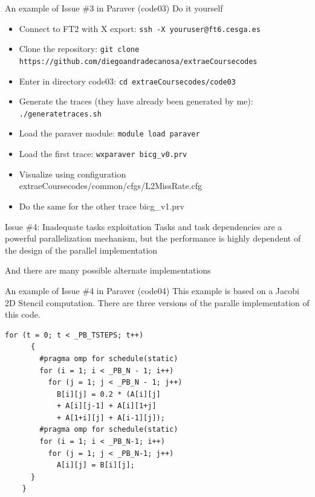 \documentclass[10pt,xcolor=table]{beamer}
\begin{document}
\begin{frame}{An example of Issue \#3 in Paraver (code03)}
Do it yourself
\begin{itemize}
    \item Connect to FT2 with X export: {\tt ssh -X youruser@ft6.cesga.es}
    \item Clone the repository: {\tt git clone https://github.com/diegoandradecanosa/extraeCoursecodes}
    \item Enter in directory code03: {\tt cd extraeCoursecodes/code03}
    \item Generate the traces (they have already been generated by me): {\tt ./generatetraces.sh}
    \item Load the paraver module:  {\tt module load paraver}
    \item Load the first trace: {\tt wxparaver bicg\_v0.prv}
    \item Visualize using configuration extraeCoursecodes/common/cfgs/L2MissRate.cfg 
    \item Do the same for the other trace bicg\_v1.prv
\end{itemize}
\end{frame}

\begin{frame}{Issue \#4: Inadequate tasks exploitation}
Tasks and task dependencies are a powerful parallelization mechanism, but the performance is highly dependent of the design of the parallel implementation

And there are many possible alternate implementations
\end{frame}

\begin{frame}[fragile]{An example of Issue \#4 in Paraver (code04)}
This example is based on a Jacobi 2D Stencil computation. There are three versions of the paralle implementation of this code. 
\begin{lstlisting}[style=shell,basicstyle=\scriptsize\ttfamily,gobble=3,caption={Parallelized with for pragmas (v0)}]
     for (t = 0; t < _PB_TSTEPS; t++)
      {
        #pragma omp for schedule(static) 
        for (i = 1; i < _PB_N - 1; i++)
          for (j = 1; j < _PB_N - 1; j++)
            B[i][j] = 0.2 * (A[i][j] 
            + A[i][j-1] + A[i][1+j] 
            + A[1+i][j] + A[i-1][j]);
        #pragma omp for schedule(static) 
        for (i = 1; i < _PB_N-1; i++)
          for (j = 1; j < _PB_N-1; j++)
            A[i][j] = B[i][j];
      }
    }
  \end{lstlisting}
\end{frame}
\end{document}
